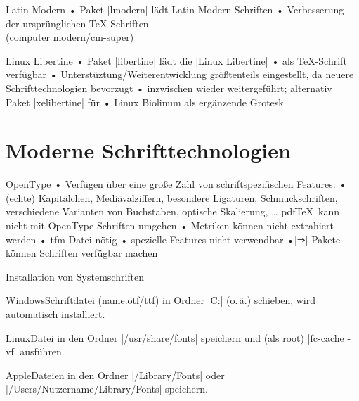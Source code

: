\begin{frame}[fragile]{Latin Modern}
• Paket |lmodern| lädt Latin Modern-Schriften
• Verbesserung der ursprünglichen \TeX-Schriften\\ (computer modern/cm-super)
\•
\end{frame}

\begin{frame}{Linux Libertine}
• Paket |libertine| lädt die |Linux Libertine|
• als \TeX-Schrift verfügbar
• Unterstüztung/Weiterentwicklung größtenteils eingestellt, da neuere Schrifttechnologien bevorzugt
• inzwischen wieder weitergeführt; alternativ Paket |xelibertine| für \XeTeX
• Linux Biolinum als ergänzende Grotesk
\•
\end{frame}

\section{Moderne Schrifttechnologien}

\begin{frame}{OpenType}
• Verfügen über eine große Zahl von schriftspezifischen Features:
• (echte) Kapitälchen, Mediävalziffern, besondere Ligaturen, Schmuckschriften, verschiedene Varianten von Buchstaben, optische Skalierung, …
\•
\pause
pdf\TeX\ kann nicht mit OpenType-Schriften umgehen
• Metriken können nicht extrahiert werden
• tfm-Datei nötig
• spezielle Features nicht verwendbar
•[⇒] Pakete können Schriften verfügbar machen
\•
\end{frame}

\begin{frame}[fragile]{Installation von Systemschriften}
\begin{block}{Windows}Schriftdatei (name.otf/ttf) in Ordner |C:\WINDOWS\Fonts| (o.\,ä.) schieben, wird automatisch installiert.
\end{block}
\begin{block}{Linux}Datei in den Ordner |/usr/share/fonts| speichern und (als root) |fc-cache -vf| ausführen.
\end{block}
\begin{block}{Apple}Dateien in den Ordner |/Library/Fonts| oder |/Users/Nutzername/Library/Fonts| speichern.
\end{block}
\end{frame}

